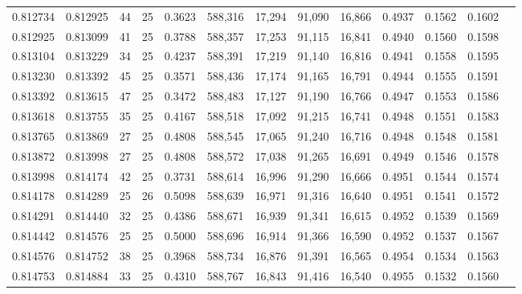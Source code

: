\begin{tabular}{rrrrrrrrrrrrr}
0.812734 & 0.812925 &    44 &  25 &                                     0.3623 & 588,316 &  17,294 &  91,090 &  16,866 & 0.4937 & 0.1562 & 0.1602 \\
0.812925 & 0.813099 &    41 &  25 &                                     0.3788 & 588,357 &  17,253 &  91,115 &  16,841 & 0.4940 & 0.1560 & 0.1598 \\
0.813104 & 0.813229 &    34 &  25 &                                     0.4237 & 588,391 &  17,219 &  91,140 &  16,816 & 0.4941 & 0.1558 & 0.1595 \\
0.813230 & 0.813392 &    45 &  25 &                                     0.3571 & 588,436 &  17,174 &  91,165 &  16,791 & 0.4944 & 0.1555 & 0.1591 \\
0.813392 & 0.813615 &    47 &  25 &                                     0.3472 & 588,483 &  17,127 &  91,190 &  16,766 & 0.4947 & 0.1553 & 0.1586 \\
0.813618 & 0.813755 &    35 &  25 &                                     0.4167 & 588,518 &  17,092 &  91,215 &  16,741 & 0.4948 & 0.1551 & 0.1583 \\
0.813765 & 0.813869 &    27 &  25 &                                     0.4808 & 588,545 &  17,065 &  91,240 &  16,716 & 0.4948 & 0.1548 & 0.1581 \\
0.813872 & 0.813998 &    27 &  25 &                                     0.4808 & 588,572 &  17,038 &  91,265 &  16,691 & 0.4949 & 0.1546 & 0.1578 \\
0.813998 & 0.814174 &    42 &  25 &                                     0.3731 & 588,614 &  16,996 &  91,290 &  16,666 & 0.4951 & 0.1544 & 0.1574 \\
0.814178 & 0.814289 &    25 &  26 &                                     0.5098 & 588,639 &  16,971 &  91,316 &  16,640 & 0.4951 & 0.1541 & 0.1572 \\
0.814291 & 0.814440 &    32 &  25 &                                     0.4386 & 588,671 &  16,939 &  91,341 &  16,615 & 0.4952 & 0.1539 & 0.1569 \\
0.814442 & 0.814576 &    25 &  25 &                                     0.5000 & 588,696 &  16,914 &  91,366 &  16,590 & 0.4952 & 0.1537 & 0.1567 \\
0.814576 & 0.814752 &    38 &  25 &                                     0.3968 & 588,734 &  16,876 &  91,391 &  16,565 & 0.4954 & 0.1534 & 0.1563 \\
0.814753 & 0.814884 &    33 &  25 &                                     0.4310 & 588,767 &  16,843 &  91,416 &  16,540 & 0.4955 & 0.1532 & 0.1560 \\

\end{tabular}
